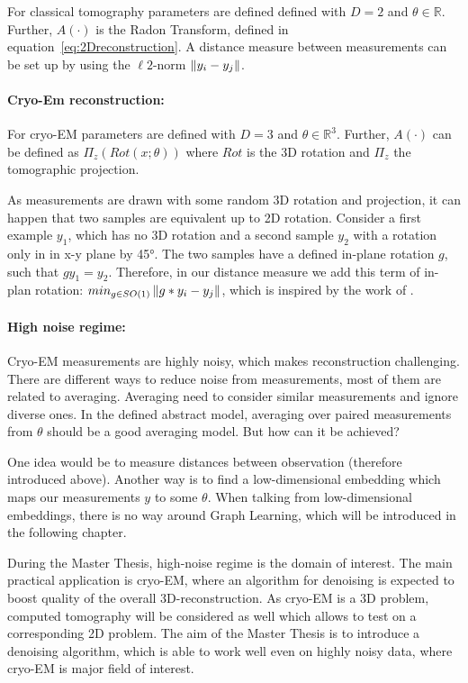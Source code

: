 For classical tomography parameters are defined defined with $D=2$ and $\theta \in \mathbb{R}$.
Further, $A(\cdot)$ is the Radon Transform, defined in equation~\ref{eq:2Dreconstruction}.
A distance measure between measurements can be set up by using the $\ell2$-norm $\left\lVert y_i - y_j\right\rVert$.

\paragraph{Cryo-Em reconstruction:}
For cryo-EM parameters are defined with $D=3$ and $\theta \in \mathbb{R}^3$.
Further, $A(\cdot)$ can be defined as $\Pi_z \left( Rot(x; \theta) \right)$ 
where $Rot$ is the 3D rotation and $\Pi_z$ the tomographic projection.

As measurements are drawn with some random 3D rotation and projection, 
it can happen that two samples are equivalent up to 2D rotation. 
Consider a first example $y_1$, which has no 3D rotation and 
a second sample $y_2$ with a rotation only in in x-y plane by 45°.
The two samples have a defined in-plane rotation $g$, such that $g y_1 = y_2$.
Therefore, in our distance measure we add this term of in-plan rotation: $min_{g \in SO(1)}\left\lVert g * y_i - y_j\right\rVert$, 
which is inspired by the work of \cite{multiDiffusionMaps}. 


\paragraph{High noise regime:}
Cryo-EM measurements are highly noisy, which makes reconstruction challenging. 
There are different ways to reduce noise from measurements, most of them are related to averaging. 
Averaging need to consider similar measurements and ignore diverse ones. 
In the defined abstract model, averaging over paired measurements from $\theta$ should be a good averaging model.
But how can it be achieved? 

One idea would be to measure distances between observation (therefore introduced above).
Another way is to find a low-dimensional embedding which maps our measurements $y$ to some $\theta$.
When talking from low-dimensional embeddings, there is no way around Graph Learning, which will be introduced
in the following chapter.

\begin{tcolorbox}[colback=red!5!white,colframe=red!75!black]
    During the Master Thesis, high-noise regime is the domain of interest.
    The main practical application is cryo-EM, where an algorithm for denoising is expected to boost
    quality of the overall 3D-reconstruction. As cryo-EM is a 3D problem, computed tomography will
    be considered as well which allows to test on a corresponding 2D problem.
    The aim of the Master Thesis is to introduce a denoising algorithm, which is able to work well even 
    on highly noisy data, where cryo-EM is major field of interest.
\end{tcolorbox}

